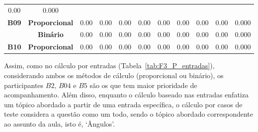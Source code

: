 \begin{table}[htbp]
\begin{tabular}{|c|cccccccccc|}
		\multicolumn{1}{c|}{0.00} &
		0.000 \\ \cline{2-11} 
		\multirow{-2}{*}{\textbf{B09}} &
		\multicolumn{1}{c|}{\cellcolor[HTML]{F2F2F2}\textbf{Proporcional}} &
		\multicolumn{1}{c|}{\cellcolor[HTML]{F2F2F2}0.00} &
		\multicolumn{1}{c|}{\cellcolor[HTML]{F2F2F2}0.00} &
		\multicolumn{1}{c|}{\cellcolor[HTML]{F2F2F2}0.00} &
		\multicolumn{1}{c|}{\cellcolor[HTML]{F2F2F2}0.00} &
		\multicolumn{1}{c|}{\cellcolor[HTML]{F2F2F2}0.00} &
		\multicolumn{1}{c|}{\cellcolor[HTML]{F2F2F2}0.00} &
		\multicolumn{1}{c|}{\cellcolor[HTML]{F2F2F2}0.00} &
		\multicolumn{1}{c|}{\cellcolor[HTML]{F2F2F2}0.00} &
		\cellcolor[HTML]{F2F2F2}0.000 \\ \hline
		&
		\multicolumn{1}{c|}{\textbf{Binário}} &
		\multicolumn{1}{c|}{0.00} &
		\multicolumn{1}{c|}{0.00} &
		\multicolumn{1}{c|}{0.00} &
		\multicolumn{1}{c|}{0.00} &
		\multicolumn{1}{c|}{0.00} &
		\multicolumn{1}{c|}{0.00} &
		\multicolumn{1}{c|}{0.00} &
		\multicolumn{1}{c|}{0.00} &
		0.000 \\ \cline{2-11} 
		\multirow{-2}{*}{\textbf{B10}} &
		\multicolumn{1}{c|}{\cellcolor[HTML]{F2F2F2}\textbf{Proporcional}} &
		\multicolumn{1}{c|}{\cellcolor[HTML]{F2F2F2}0.00} &
		\multicolumn{1}{c|}{\cellcolor[HTML]{F2F2F2}0.00} &
		\multicolumn{1}{c|}{\cellcolor[HTML]{F2F2F2}0.00} &
		\multicolumn{1}{c|}{\cellcolor[HTML]{F2F2F2}0.00} &
		\multicolumn{1}{c|}{\cellcolor[HTML]{F2F2F2}0.00} &
		\multicolumn{1}{c|}{\cellcolor[HTML]{F2F2F2}0.00} &
		\multicolumn{1}{c|}{\cellcolor[HTML]{F2F2F2}0.00} &
		\multicolumn{1}{c|}{\cellcolor[HTML]{F2F2F2}0.00} &
		\cellcolor[HTML]{F2F2F2}0.000 \\ \hline
	\end{tabular}
	\label{tab:F3_P_casos_semagrupamento}
\end{table}

Assim, como no cálculo por entradas (Tabela~\ref{tab:F3_P_entradas}), considerando ambos os métodos de cálculo (proporcional ou binário), os participantes $B2$, $B04$ e $B5$ são os que tem maior prioridade de acompanhamento. Além disso, enquanto o cálculo baseado nas entradas enfatiza um tópico abordado a partir de uma entrada específica, o cálculo por casos de teste considera a questão como um todo, sendo o tópico abordado correspondente ao assunto da aula, isto é, `Ângulos'. 

